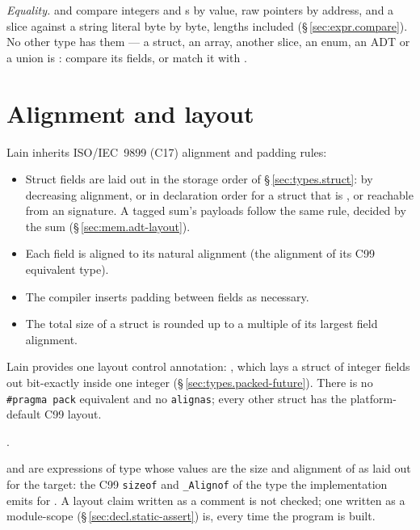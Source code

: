 \pnum
\textit{Equality.}  \lain{==} and \lain{!=} compare integers and s by value,
raw pointers by address, and a slice against a string literal byte by byte, lengths
included (\S\,\ref{sec:expr.compare}).  No other type has them --- a struct, an array,
another slice, an enum, an ADT or a union is : compare its fields, or match
it with .

\section{Alignment and layout}
\label{sec:mem.alignment}

\pnum
Lain inherits ISO/IEC~9899 (C17) alignment and padding rules:
\begin{itemize}
  \item Struct fields are laid out in the storage order of \S\,\ref{sec:types.struct}: by
        decreasing alignment, or in declaration order for a struct that is \tok{[ordered]},
        \tok{[packed]} or reachable from an  signature. A tagged sum's payloads
        follow the same rule, decided by the sum (\S\,\ref{sec:mem.adt-layout}).
  \item Each field is aligned to its natural alignment (the alignment of
        its C99 equivalent type).
  \item The compiler inserts padding between fields as necessary.
  \item The total size of a struct is rounded up to a multiple of its
        largest field alignment.
\end{itemize}

\pnum
Lain provides one layout control annotation: \tok{[packed]}, which lays a struct of integer
fields out bit-exactly inside one integer (\S\,\ref{sec:types.packed-future}). There is no
\texttt{\#pragma pack} equivalent and no \texttt{alignas}; every other struct has the
platform-default C99 layout.

.

\pnum
{} and  are expressions of type  whose values
are the size and alignment of  as laid out for the target: the C99 \texttt{sizeof}
and \texttt{\_Alignof} of the type the implementation emits for . A layout claim
written as a comment is not checked; one written as a module-scope
 (\S\,\ref{sec:decl.static-assert}) is, every time the program
is built.

